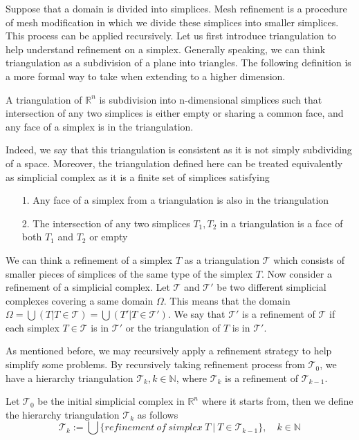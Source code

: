 Suppose that a domain is divided into simplices. Mesh refinement is a procedure of mesh modification in which we divide these simplices into smaller simplices. This process can be applied recursively. Let us first introduce triangulation to help understand refinement on a simplex. Generally speaking, we can think triangulation as a subdivision of a plane into triangles. The following definition is a more formal way to take when extending to a higher dimension.
    \begin{definition}
    A triangulation of $\mathbb R^n$ is subdivision into n-dimensional simplices such that intersection of any two simplices is either empty or sharing a common face, and any face of a simplex is in the triangulation.
    \end{definition}
    Indeed, we say that this triangulation is consistent as it is not simply subdividing of a space. Moreover, the triangulation defined here can be treated equivalently as simplicial complex as it is a finite set of simplices satisfying
    \begin{itemize}
        \item[1.] Any face of a simplex from a triangulation is also in the triangulation
        \item[2.] The intersection of any two simplices $T_1, T_2 $ in a triangulation is a face of both $T_1$ and  $T_2$ or empty
    \end{itemize}
    

    We can think a refinement of a simplex $T$ as a triangulation $\mathcal{T}$ which consists of smaller pieces of simplices of the same type of the simplex $T$. Now consider a refinement of a simplicial complex. Let $\mathcal{T}$ and $\mathcal{T'}$ be two different simplicial complexes covering a same domain $\Omega$. This means that the domain \(\Omega = \displaystyle \bigcup({T \vert T\in \mathcal{T}}) = \bigcup({T' \vert T\in \mathcal{T'}})\). We say that $\mathcal{T'}$ is a refinement of $\mathcal{T}$ if each simplex $T\in\mathcal{T}$ is in $\mathcal{T'}$ or the triangulation of $T$ is in $\mathcal{T'}$.

    As mentioned before, we may recursively apply a refinement strategy to help simplify some problems. By recursively taking refinement process from $\mathcal{T}_0$, we have a hierarchy triangulation $\mathcal{T}_k, k\in\mathbb{N}$, where $\mathcal{T}_k$ is a refinement of $\mathcal{T}_{k-1}$. 
    \begin{definition}
    Let $\mathcal{T}_0$ be the initial simplicial complex in $\mathbb{R}^n$ where it starts from, then we define the hierarchy triangulation $\mathcal{T}_k$ as follows
    \begin{equation*}
    \mathcal{T}_k := \bigcup\{refinement~of~simplex~T ~\vert ~T\in\mathcal{T}_{k-1}\}, \quad k\in\mathbb{N}
    \end{equation*}
    \end{definition}

